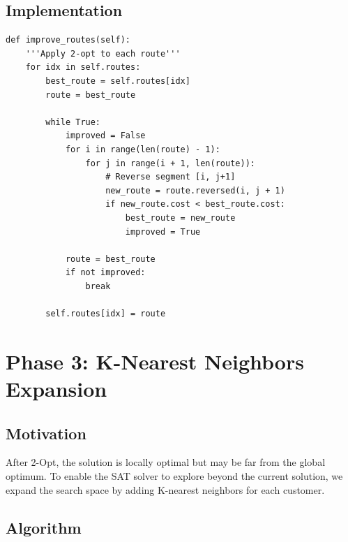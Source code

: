 \documentclass[12pt,a4paper]{article}
\theoremstyle{definition}
\begin{document}
\subsection{Implementation}

\begin{lstlisting}[caption={2-Opt Implementation}]
def improve_routes(self):
    '''Apply 2-opt to each route'''
    for idx in self.routes:
        best_route = self.routes[idx]
        route = best_route
        
        while True:
            improved = False
            for i in range(len(route) - 1):
                for j in range(i + 1, len(route)):
                    # Reverse segment [i, j+1]
                    new_route = route.reversed(i, j + 1)
                    if new_route.cost < best_route.cost:
                        best_route = new_route
                        improved = True
            
            route = best_route
            if not improved:
                break
        
        self.routes[idx] = route
\end{lstlisting}

\section{Phase 3: K-Nearest Neighbors Expansion}

\subsection{Motivation}

After 2-Opt, the solution is locally optimal but may be far from the global optimum. To enable the SAT solver to explore beyond the current solution, we expand the search space by adding K-nearest neighbors for each customer.

\subsection{Algorithm}
\end{document}
